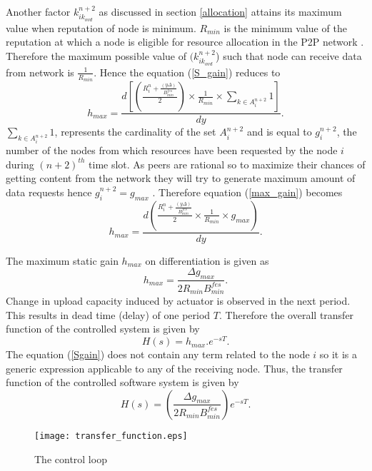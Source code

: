 \documentclass[journal]{IEEEtran}
\begin{document}
Another factor $k_{{ik}_{ovd}}^{n+2}$ as discussed in section \ref{allocation} attains its maximum value when reputation of node is minimum. $R_{min}$ is the minimum value of the reputation at which a node is eligible for resource allocation in the P2P network .
Therefore the maximum possible value of ${(k_{{ik}_{ovd}}^{n+2}}$) such that node can receive data from network is $\frac{1}{R_{min}}$.  Hence the equation (\ref{S_gain}) reduces to
\begin{equation}
	\label{max_gain}
	h_{max}=\frac{d\left[\left(\frac{R_{i}^{n}+\frac{(y\Delta)}{B_{min}^{fes}}}{2}\right)\times{\frac{1}{R_{min}}}\times{\sum\limits_{k\in{A^{n+2}_i}}1}\right]}{dy}.
\end{equation}
${\sum\limits_{k\in{A^{n+2}_i}}1}$, represents the cardinality of the set $A^{n+2}_i$ and is equal to $g_i^{n+2}$, the number of the nodes from which resources have been requested by the node $i$ during $(n+2)^{th}$ time slot. As peers are rational so to maximize their chances of getting content from the network they will try to generate maximum amount of data requests hence $g_i^{n+2}=g_{max}$ . Therefore equation (\ref{max_gain}) becomes
\begin{equation}
	\nonumber
	h_{max}=\frac{d\left(\frac{R_{i}^{n}+\frac{(y\Delta)}{B_{min}^{fes}}}{2}\times\frac{1}{R_{min}}\times{g_{max}}\right)}{dy}.
\end{equation}

The maximum static gain $h_{max}$ on differentiation is given as
\begin{equation}
	\label{Sgain}
	h_{max}=\frac{\Delta{g_{max}}}{2{R_{min}}B^{fes}_{min}}.
\end{equation}
Change in upload capacity induced by actuator is observed in the next period. This results in  dead time (delay) of one period $T$.  Therefore the overall transfer function of the controlled system is given by
\begin{equation}
	\nonumber
	\label{control software}
	{H(s)=h_{max}.e^{-sT}}.
\end{equation}
The equation (\ref{Sgain}) does not contain any term related to the node $i$ so it is a generic expression applicable to any of the receiving node. Thus, the transfer function of the controlled software system is given by
\begin{equation}
	H(s)=\left(\frac{\Delta{g_{max}}}{2R_{min}B^{fes}_{min}}\right)e^{-sT}.
\end{equation}
\begin{figure}
	\centering
	\texttt{[image: transfer\_function.eps]}
	\caption{The control loop }
	\label{Transfer_Function}
\end{figure}  
\end{document}
